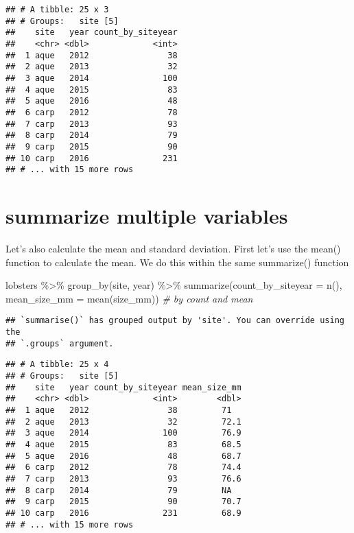 \documentclass[
]{article}
\newenvironment{Shaded}{\begin{snugshade}}{\end{snugshade}}
\newcommand{\AttributeTok}[1]{\textcolor[rgb]{0.77,0.63,0.00}{#1}}
\newcommand{\CommentTok}[1]{\textcolor[rgb]{0.56,0.35,0.01}{\textit{#1}}}
\newcommand{\FunctionTok}[1]{\textcolor[rgb]{0.00,0.00,0.00}{#1}}
\newcommand{\NormalTok}[1]{#1}
\newcommand{\SpecialCharTok}[1]{\textcolor[rgb]{0.00,0.00,0.00}{#1}}
\begin{document}
\begin{verbatim}
## # A tibble: 25 x 3
## # Groups:   site [5]
##    site   year count_by_siteyear
##    <chr> <dbl>             <int>
##  1 aque   2012                38
##  2 aque   2013                32
##  3 aque   2014               100
##  4 aque   2015                83
##  5 aque   2016                48
##  6 carp   2012                78
##  7 carp   2013                93
##  8 carp   2014                79
##  9 carp   2015                90
## 10 carp   2016               231
## # ... with 15 more rows
\end{verbatim}

\hypertarget{summarize-multiple-variables}{%
\section{summarize multiple
variables}\label{summarize-multiple-variables}}

Let's also calculate the mean and standard deviation. First let's use
the mean() function to calculate the mean. We do this within the same
summarize() function

\begin{Shaded}
\begin{Highlighting}[]
\NormalTok{lobsters }\SpecialCharTok{\%\textgreater{}\%}
  \FunctionTok{group\_by}\NormalTok{(site, year) }\SpecialCharTok{\%\textgreater{}\%}
  \FunctionTok{summarize}\NormalTok{(}\AttributeTok{count\_by\_siteyear =}  \FunctionTok{n}\NormalTok{(),}
            \AttributeTok{mean\_size\_mm =} \FunctionTok{mean}\NormalTok{(size\_mm)) }\CommentTok{\# by count and mean}
\end{Highlighting}
\end{Shaded}

\begin{verbatim}
## `summarise()` has grouped output by 'site'. You can override using the
## `.groups` argument.
\end{verbatim}

\begin{verbatim}
## # A tibble: 25 x 4
## # Groups:   site [5]
##    site   year count_by_siteyear mean_size_mm
##    <chr> <dbl>             <int>        <dbl>
##  1 aque   2012                38         71  
##  2 aque   2013                32         72.1
##  3 aque   2014               100         76.9
##  4 aque   2015                83         68.5
##  5 aque   2016                48         68.7
##  6 carp   2012                78         74.4
##  7 carp   2013                93         76.6
##  8 carp   2014                79         NA  
##  9 carp   2015                90         70.7
## 10 carp   2016               231         68.9
## # ... with 15 more rows
\end{verbatim}
\end{document}
